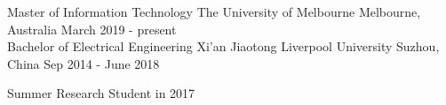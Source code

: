

\begin{cventries}

\cventry
    {Master of Information Technology} %
    {The University of Melbourne} %
    {Melbourne, Australia} %
    {March 2019 - present} %
    {}
    \\
\cventry
    {Bachelor of Electrical Engineering} %
    {Xi’an Jiaotong Liverpool University} %
    {Suzhou, China} %
    {Sep 2014 - June 2018} %
    {\begin{cvitems} %
        \item {Summer Research Student in 2017}
      \end{cvitems}}
\end{cventries}




